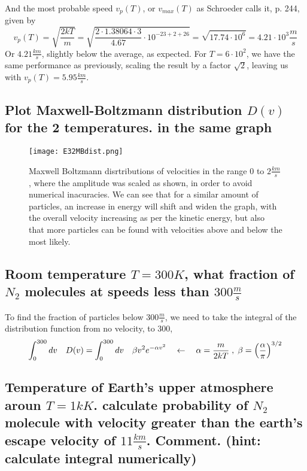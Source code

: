 \documentclass[a4paper,11pt]{article}
\begin{document}
And the most probable speed $v_p(T)$, or $v_{max}(T)$ as Schroeder calls it, p. 244\cite{ThermalSchroeder}, given by
\[ v_p(T) = \sqrt{ \frac{ 2kT }{ m } } = \sqrt{ \frac{ 2\cdot 1.38064\cdot 3 }{ 4.67 } \cdot 10^{-23 + 2 + 26} } 
    = \sqrt{ 17.74 \cdot 10^{6} } = 4.21\cdot 10^3 \frac{m}{s}\]
Or \underline{$4.21\frac{km}{s}$}, slightly below the average, as expected. For $T = 6\cdot 10^2$, we have the same performance
as previously, scaling the result by a factor $\sqrt{2}$, leaving us with \underline{$v_p(T) = 5.95 \frac{km}{s}$}.


\subsection{ Plot Maxwell-Boltzmann distribution $D(v)$ for the 2 temperatures. in the same graph }%


\begin{figure}[hbtp]
\texttt{[image: E32MBdist.png]}
\caption{Maxwell Boltzmann disrtributions of velocities in the range $0$ to $2\frac{km}{s}$, where the amplitude was scaled as shown,
    in order to avoid numerical inacuracies. We can see that for a similar amount of particles, an increase in energy will shift and widen
    the graph, with the overall velocity increasing as per the kinetic energy, but also that more particles can be found with velocities above
    and below the most likely.} 
\label{fig:n10points}
\end{figure}


\subsection{ Room temperature $T = 300K$, what fraction of $N_2$ molecules at speeds less than $300\frac{m}{s}$ }%

To find the fraction of particles below $300\frac{m}{s}$, we need to take the integral of the distribution function from no velocity, to
$300$, 
\[ \int_0^{300}dv\quad D(v) =  \int_0^{300}dv\quad \beta v^2e^{-\alpha v^2} 
    \quad \leftarrow \quad \alpha = \frac{ m }{ 2kT } \; , \; \beta = \qty( \frac{ \alpha }{ \pi } )^{3/2} \] 


\subsection{ Temperature of Earth's upper atmosphere aroun $T=1kK$. calculate probability of $N_2$ molecule with velocity 
            greater than the earth's escape velocity of $11\frac{km}{s}$. Comment. (hint: calculate integral numerically) }%
\end{document}
